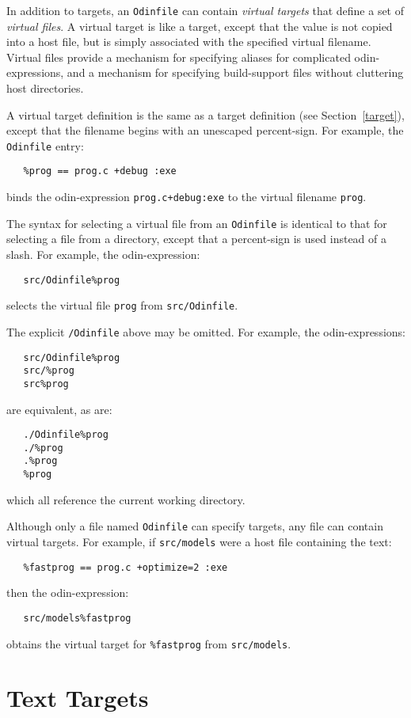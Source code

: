 \documentclass[hidelinks]{report}
\newcommand{\ex}{\tt}   %
\begin{document}
In addition to targets,
an {\ex Odinfile} can contain {\em virtual targets}
that define a set of {\em virtual files}.
A virtual target is like a target,
except that the value is not copied into a host file,
but is simply associated with the specified virtual filename.
Virtual files provide a mechanism for specifying aliases
for complicated odin-expressions,
and a mechanism for specifying build-support files without cluttering
host directories.

A virtual target definition is the same as a target definition
(see Section~\ref{target}),
except that the filename begins with an unescaped percent-sign.
For example, the {\ex Odinfile} entry:
\begin{verbatim}
   %prog == prog.c +debug :exe
\end{verbatim}
binds the odin-expression {\ex prog.c+debug:exe}
to the virtual filename {\ex prog}.

The syntax for selecting a virtual file from an {\ex Odinfile} is
identical to that for selecting a file from a directory,
except that a percent-sign is used instead of a slash.
For example, the odin-expression:
\begin{verbatim}
   src/Odinfile%prog
\end{verbatim}
selects the virtual file {\ex prog} from {\ex src/Odinfile}.

The explicit {\ex /Odinfile} above may be omitted. For example, the
odin-expressions:
\begin{verbatim}
   src/Odinfile%prog
   src/%prog
   src%prog
\end{verbatim}
are equivalent, as are:
\begin{verbatim}
   ./Odinfile%prog
   ./%prog
   .%prog
   %prog
\end{verbatim}
which all reference the current working directory.

Although only a file named {\ex Odinfile} can specify targets,
any file can contain virtual targets.
For example, if {\ex src/models} were a host file containing the text:
\begin{verbatim}
   %fastprog == prog.c +optimize=2 :exe
\end{verbatim}
then the odin-expression:
\begin{verbatim}
   src/models%fastprog
\end{verbatim}
obtains the virtual target for {\ex \%fastprog} from {\ex src/models}.


\section{Text Targets}
\label{texttarget}
\end{document}
